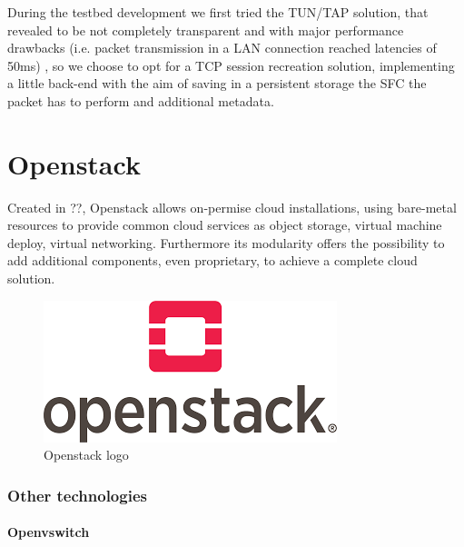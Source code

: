 \documentclass[10pt]{book}
\begin{document}
During the testbed development we first tried the TUN/TAP solution, that 
revealed to be not completely transparent and with major performance drawbacks 
(i.e. packet transmission in a LAN connection reached latencies of 50ms) 
, so we choose to opt for a TCP session recreation solution, 
implementing a little back-end with the aim of saving in a persistent storage 
the SFC the packet has to perform and additional metadata.


\section{Openstack}
\label{chap:prjan:sec:openstack}
Created in ??, 
Openstack allows on-permise cloud installations, using bare-metal resources to 
provide common cloud services as object storage, virtual machine deploy, 
virtual networking. Furthermore its modularity offers the possibility to add 
additional components, even proprietary, to achieve a complete cloud solution.
\begin{figure}[t]
 \centering
 \includegraphics[scale=0.58]{openstack_logo}
 \caption{Openstack logo}
 \label{chap:prjan:img:openstack_logo}
\end{figure}








\subsubsection{Other technologies}
\paragraph{Openvswitch}
\end{document}
